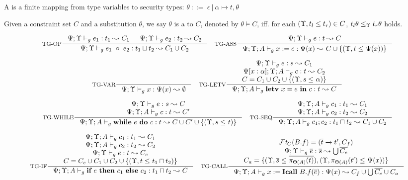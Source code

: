 {{{A  is a finite mapping from type variables to security types:
$
\theta ~::=~ \epsilon~|~\alpha \mapsto t,\theta
$


\begin{definition}
Given a constraint set $C$ and a substitution $\theta$, we say $\theta$ is a  to $C$, denoted by $\theta \vDash C $, iff. for each $(\Upsilon, t_l \leq t_r) \in C$, $t_l\theta \leq_{\Upsilon} t_r\theta $ holds.
\end{definition}

\begin{figure*}[ht]
\begin{tiny}
\[
\inference[TG-OP]
{\Psi;\trace \vdash_{g} e_1: t_1 \leadsto C_1 &
 \Psi;\trace \vdash_{g} e_2: t_2 \leadsto C_2}
{\Psi;\trace \vdash_{g} \leOP{e_1}{e_2} : t_1\sqcup t_2\leadsto C_1\cup C_2}
\quad
\inference[TG-ASS]
{\Psi;\trace \vdash_{g} e : t \leadsto C }
{\Psi;\trace; A \vdash_{g} \lcASS{x}{e} : \Psi(x)\leadsto C\cup \{ (\trace, t \leq_{} \Psi(x))\} }
\]



\[
\inference[TG-VAR]
{}
{\Psi;\trace \vdash_{g} \leVAR{x} : \Psi(x)\leadsto \emptyset}
\quad
\inference[TG-LETV]
{\Psi;\trace \vdash_{g} e : s \leadsto C_1 \\
\Psi[x:\alpha]; \trace; A \vdash_{g} c : t \leadsto C_2 \\
C = C_1\cup C_2 \cup \{(\trace, s \leq_{} \alpha) \}
}
{\Psi;\trace; A\vdash_{g} \lcLETV{x}{e}{c} :  t\leadsto C}
\]


\[
\inference[TG-WHILE]
{
\Psi;\trace \vdash_{g} e : s  \leadsto C \\
\Psi;\trace; A \vdash_{g} c : t \leadsto C'
}
{\Psi;\trace;  A \vdash_{g} \lcWHILE{e}{c} : t  \leadsto C\cup C' \cup\{(\trace,s\leq_{} t)\}}
\quad
\inference[TG-SEQ]
{
\Psi;\trace; A \vdash_{g} c_1 : t_1  \leadsto C_1 \\
\Psi;\trace; A \vdash_{g} c_2 : t_2 \leadsto C_2
}
{\Psi;\trace; A \vdash_{g} \lcSEQ{c_1}{c_2} : t_1\sqcap t_2 \leadsto C_1\cup C_2}
\]

\[
\inference[TG-IF]
{
\Psi;\trace; A \vdash_{g} c_1 : t_1 \leadsto C_1 \\
\Psi;\trace; A \vdash_{g} c_2 : t_2 \leadsto C_2 \\
\Psi;\trace \vdash_{g} e : t \leadsto C_e \\
C = C_e\cup C_1\cup C_2 \cup \{(\trace, t \leq_{} t_1\sqcap t_2) \}}
{\Psi;\trace;  A \vdash_{g} \lcIF{e}{c_1}{c_2} : t_1\sqcap t_2 \leadsto C}
\quad
\inference[TG-CALL]
{
\FT_{C}(B.f) = (\overline{t} \xrightarrow{} t', C_{f})  \\
\Psi;\trace \vdash_{g} \overline{e} : \overline{s} \leadsto \bigcup \overline{C_{e}} \\
C_{a} = \{(\trace, \overline{s}\leq_{} \overline{\app{t}{\Theta(A)}}), (\trace, \app{t'}{\Theta(A)}\leq_{} \Psi(x))\} }
{
\Psi;\trace; A \vdash_{g} \lcCALL{x}{B.f}{\overline{e}} : \Psi(x)\leadsto C_{f} \cup \bigcup\overline{C_{e}}\cup C_{a}
}
\]


\end{tiny}
\end{figure*}}}}
